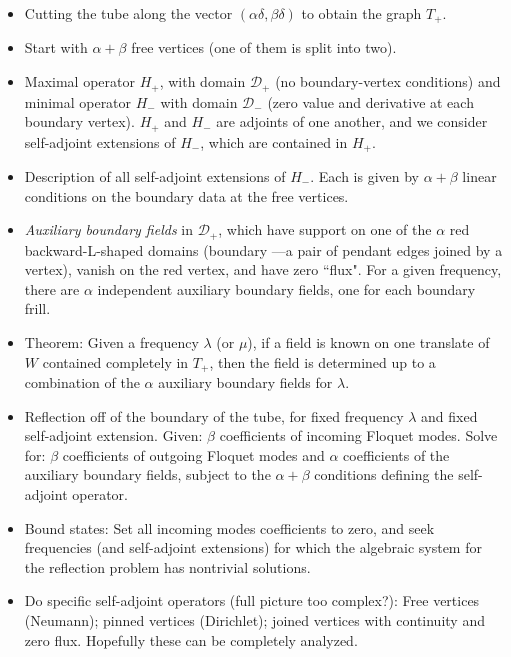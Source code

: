 \documentclass[12pt]{article}
\newcommand{\Dmax}{\mathcal{D}_+}
\newcommand{\Dmin}{\mathcal{D}_-}
\begin{document}
\begin{itemize}
\item Cutting the tube along the vector $(\alpha\delta,\beta\delta)$ to obtain the graph $T_+$.

\item Start with $\alpha+\beta$ free vertices (one of them is split into two).

\item Maximal operator $H_+$, with domain $\Dmax$ (no boundary-vertex conditions) and minimal operator $H_-$ with domain $\Dmin$ (zero value and derivative at each boundary vertex).  $H_+$ and $H_-$ are adjoints of one another, and we consider self-adjoint extensions of $H_-$, which are contained in $H_+$.

\item Description of all self-adjoint extensions of $H_-$.  Each is given by $\alpha+\beta$ linear conditions on the boundary data at the free vertices.

\item {\em Auxiliary boundary fields} in $\Dmax$, which have support on one of the $\alpha$ red backward-L-shaped domains (boundary ---a pair of pendant edges joined by a vertex), vanish on the red vertex, and have zero ``flux".  For a given frequency, there are $\alpha$ independent auxiliary boundary fields, one for each boundary frill.

\item Theorem: Given a frequency $\lambda$ (or $\mu$), if a field is known on one translate of $W$ contained completely in $T_+$, then the field is determined up to a combination of the $\alpha$ auxiliary boundary fields for $\lambda$.

\item Reflection off of the boundary of the tube, for fixed frequency $\lambda$ and fixed self-adjoint extension.  Given: $\beta$ coefficients of incoming Floquet modes.  Solve for:  $\beta$ coefficients of outgoing Floquet modes and $\alpha$ coefficients of the auxiliary boundary fields, subject to the $\alpha+\beta$ conditions defining the self-adjoint operator.

\item Bound states:  Set all incoming modes coefficients to zero, and seek frequencies (and self-adjoint extensions) for which the algebraic system for the reflection problem has nontrivial solutions.

\item Do specific self-adjoint operators (full picture too complex?):  Free vertices (Neumann); pinned vertices (Dirichlet); joined vertices with continuity and zero flux.  Hopefully these can be completely analyzed.

\end{itemize}
\end{document}
